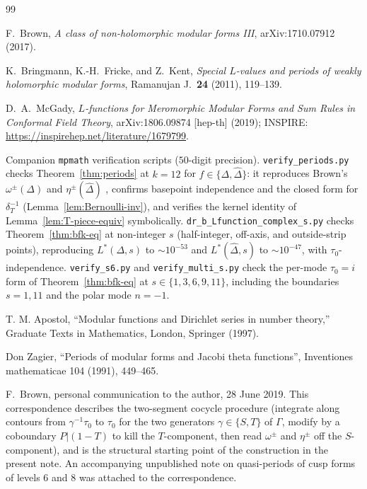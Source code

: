 \documentclass[11pt]{article}
\numberwithin{equation}{section}  %
\newcommand{\Dhat}{\widehat{\Delta}}
\begin{document}
\begin{thebibliography}{99}

F.\ Brown,
\emph{A class of non-holomorphic modular forms III},
arXiv:1710.07912 (2017).

K.\ Bringmann, K.-H.\ Fricke, and Z.\ Kent,
\emph{Special $L$-values and periods of weakly holomorphic modular forms},
Ramanujan J.\ \textbf{24} (2011), 119--139.

D.\ A.\ McGady,
\emph{$L$-functions for Meromorphic Modular Forms and Sum Rules in
Conformal Field Theory},
arXiv:1806.09874 [hep-th] (2019);
INSPIRE: \url{https://inspirehep.net/literature/1679799}.

Companion \texttt{mpmath} verification scripts ($50$-digit precision).
\texttt{verify\_periods.py} checks Theorem~\ref{thm:periods} at $k = 12$
for $f \in \{\Delta, \Dhat\}$: it reproduces Brown's
$\omega^\pm(\Delta)$ and $\eta^\pm(\Dhat)$ \cite{Brown2017}, confirms
basepoint independence and the closed form for $\delta_T^{-1}$
(Lemma~\ref{lem:Bernoulli-inv}), and verifies the kernel identity of
Lemma~\ref{lem:T-piece-equiv} symbolically.
\texttt{dr\_b\_Lfunction\_complex\_s.py} checks Theorem~\ref{thm:bfk-eq}
at non-integer $s$ (half-integer, off-axis, and outside-strip points),
reproducing $L^*(\Delta, s)$ to $\sim 10^{-53}$ and $L^*(\Dhat, s)$ to
$\sim 10^{-47}$, with $\tau_0$-independence.
\texttt{verify\_s6.py} and \texttt{verify\_multi\_s.py} check the
per-mode $\tau_0 = i$ form of Theorem~\ref{thm:bfk-eq} at
$s \in \{1, 3, 6, 9, 11\}$, including the boundaries $s = 1, 11$ and the
polar mode $n = -1$.

T. M. Apostol, 
``Modular functions and Dirichlet series in number theory,''
Graduate Texts in Mathematics, London, Springer (1997).

Don Zagier, 
``Periods of modular forms and Jacobi theta functions'', 
Inventiones mathematicae 104 (1991), 449--465.


F.\ Brown, personal communication to the author, 28 June 2019.  This
correspondence describes the two-segment cocycle procedure (integrate
along contours from $\gamma^{-1}\tau_0$ to $\tau_0$ for the two
generators $\gamma \in \{S, T\}$ of $\Gamma$, modify by a coboundary
$P|(1 - T)$ to kill the $T$-component, then read $\omega^\pm$ and
$\eta^\pm$ off the $S$-component), and is the structural starting
point of the construction in the present note.  An accompanying
unpublished note on quasi-periods of cusp forms of levels $6$ and $8$
was attached to the correspondence.


\end{thebibliography}
\end{document}
